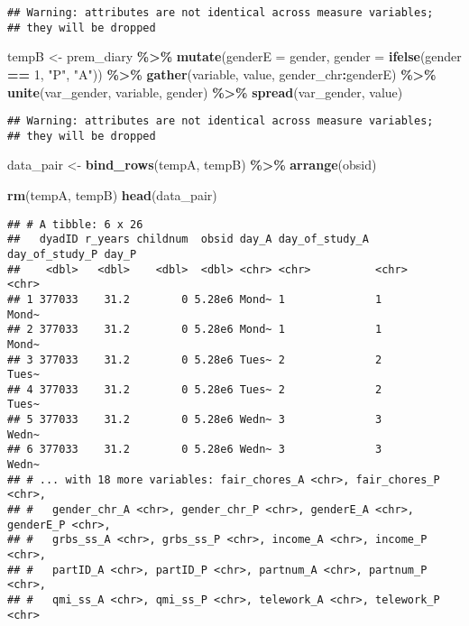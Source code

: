 \documentclass[
]{article}
\newenvironment{Shaded}{\begin{snugshade}}{\end{snugshade}}
\newcommand{\DataTypeTok}[1]{\textcolor[rgb]{0.13,0.29,0.53}{#1}}
\newcommand{\DecValTok}[1]{\textcolor[rgb]{0.00,0.00,0.81}{#1}}
\newcommand{\KeywordTok}[1]{\textcolor[rgb]{0.13,0.29,0.53}{\textbf{#1}}}
\newcommand{\NormalTok}[1]{#1}
\newcommand{\OperatorTok}[1]{\textcolor[rgb]{0.81,0.36,0.00}{\textbf{#1}}}
\newcommand{\StringTok}[1]{\textcolor[rgb]{0.31,0.60,0.02}{#1}}
\begin{document}
\begin{verbatim}
## Warning: attributes are not identical across measure variables;
## they will be dropped
\end{verbatim}

\begin{Shaded}
\begin{Highlighting}[]
\NormalTok{tempB \textless{}{-}}\StringTok{ }\NormalTok{prem\_diary }\OperatorTok{\%\textgreater{}\%}\StringTok{ }
\StringTok{  }\KeywordTok{mutate}\NormalTok{(}\DataTypeTok{genderE =}\NormalTok{ gender,}
         \DataTypeTok{gender =} \KeywordTok{ifelse}\NormalTok{(gender }\OperatorTok{==}\StringTok{ }\DecValTok{1}\NormalTok{, }\StringTok{"P"}\NormalTok{, }\StringTok{"A"}\NormalTok{)) }\OperatorTok{\%\textgreater{}\%}
\StringTok{  }\KeywordTok{gather}\NormalTok{(variable, value, gender\_chr}\OperatorTok{:}\NormalTok{genderE) }\OperatorTok{\%\textgreater{}\%}
\StringTok{  }\KeywordTok{unite}\NormalTok{(var\_gender, variable, gender) }\OperatorTok{\%\textgreater{}\%}
\StringTok{  }\KeywordTok{spread}\NormalTok{(var\_gender, value)}
\end{Highlighting}
\end{Shaded}

\begin{verbatim}
## Warning: attributes are not identical across measure variables;
## they will be dropped
\end{verbatim}

\begin{Shaded}
\begin{Highlighting}[]
\NormalTok{data\_pair \textless{}{-}}\StringTok{ }\KeywordTok{bind\_rows}\NormalTok{(tempA, tempB) }\OperatorTok{\%\textgreater{}\%}
\StringTok{  }\KeywordTok{arrange}\NormalTok{(obsid) }
  
\KeywordTok{rm}\NormalTok{(tempA, tempB)}
\KeywordTok{head}\NormalTok{(data\_pair)}
\end{Highlighting}
\end{Shaded}

\begin{verbatim}
## # A tibble: 6 x 26
##   dyadID r_years childnum  obsid day_A day_of_study_A day_of_study_P day_P
##    <dbl>   <dbl>    <dbl>  <dbl> <chr> <chr>          <chr>          <chr>
## 1 377033    31.2        0 5.28e6 Mond~ 1              1              Mond~
## 2 377033    31.2        0 5.28e6 Mond~ 1              1              Mond~
## 3 377033    31.2        0 5.28e6 Tues~ 2              2              Tues~
## 4 377033    31.2        0 5.28e6 Tues~ 2              2              Tues~
## 5 377033    31.2        0 5.28e6 Wedn~ 3              3              Wedn~
## 6 377033    31.2        0 5.28e6 Wedn~ 3              3              Wedn~
## # ... with 18 more variables: fair_chores_A <chr>, fair_chores_P <chr>,
## #   gender_chr_A <chr>, gender_chr_P <chr>, genderE_A <chr>, genderE_P <chr>,
## #   grbs_ss_A <chr>, grbs_ss_P <chr>, income_A <chr>, income_P <chr>,
## #   partID_A <chr>, partID_P <chr>, partnum_A <chr>, partnum_P <chr>,
## #   qmi_ss_A <chr>, qmi_ss_P <chr>, telework_A <chr>, telework_P <chr>
\end{verbatim}
\end{document}
